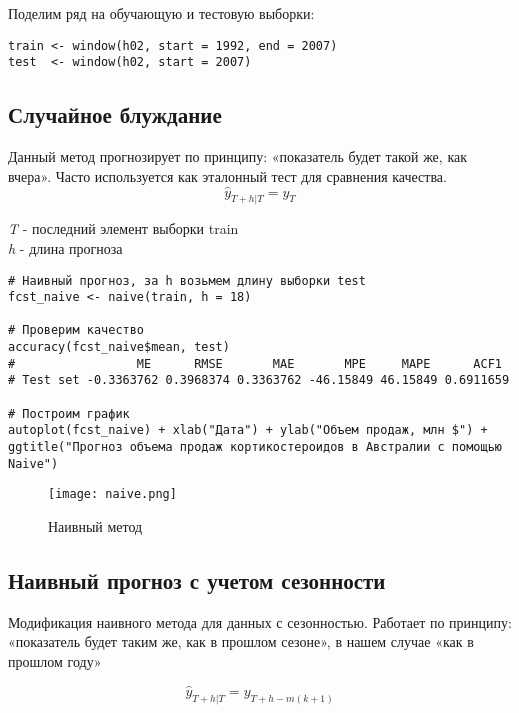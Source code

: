 \documentclass[a4paper,12pt]{article}
\theoremstyle{plain} %
\theoremstyle{definition} %
\theoremstyle{remark} %
\begin{document}
Поделим ряд на обучающую и тестовую выборки:
\begin{verbatim}
train <- window(h02, start = 1992, end = 2007)
test  <- window(h02, start = 2007)
\end{verbatim}

\newpage

\subsection{Случайное блуждание}
Данный метод прогнозирует по принципу: «показатель будет такой же, как вчера». Часто используется как эталонный тест для сравнения качества.
\begin{equation}
  \hat{y}_{T+h|T} = y_{T}
\end{equation}

\begin{center}
  \textit{T} - последний элемент выборки train \\
  \textit{h} - длина прогноза
\end{center}



\begin{verbatim}
# Наивный прогноз, за h возьмем длину выборки test
fcst_naive <- naive(train, h = 18)

# Проверим качество
accuracy(fcst_naive$mean, test)
#                 ME      RMSE       MAE       MPE     MAPE      ACF1
# Test set -0.3363762 0.3968374 0.3363762 -46.15849 46.15849 0.6911659

# Построим график
autoplot(fcst_naive) + xlab("Дата") + ylab("Объем продаж, млн $") +
ggtitle("Прогноз объема продаж кортикостероидов в Австралии с помощью Naive")
\end{verbatim}


 \begin{figure}[H]
  \texttt{[image: naive.png]}
  \caption{Наивный метод}
\end{figure}

\newpage


\subsection{Наивный прогноз с учетом сезонности}
Модификация наивного метода для данных с сезонностью.
Работает по принципу:  «показатель будет таким же, как в прошлом сезоне», в нашем случае «как в прошлом году»

\[
\hat{y}_{T+h|T} = y_{T+h-m(k+1)}
\]
\end{document}

